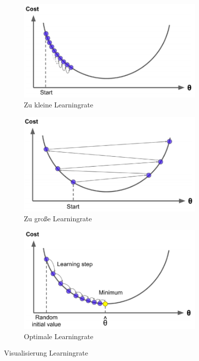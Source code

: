 \begin{figure}[H]
	\begin{subfigure}[b]{0.32\linewidth}
		\centering
		\includegraphics[width=\linewidth]{bilder/Learningrate_small(Geron).PNG}
		\caption{Zu kleine Learningrate}
		\label{abb: LearingrateSmall}
	\end{subfigure}	
	\begin{subfigure}[b]{0.32\linewidth}
		\centering
		\includegraphics[width=\linewidth]{bilder/Learningrate_large(Geron).PNG}
		\caption{Zu große Learningrate}
		\label{abb: LearningrateLarge}
	\end{subfigure}
	\begin{subfigure}[b]{0.32 \linewidth}
		\centering
		\includegraphics[width=\linewidth]{bilder/Learningrate_optimal(Geron).PNG}
		\caption{Optimale Learningrate}
		\label{abb: LearningrateOptimal}
	\end{subfigure}
	
	\caption{Visualisierung Learningrate}
\end{figure}

